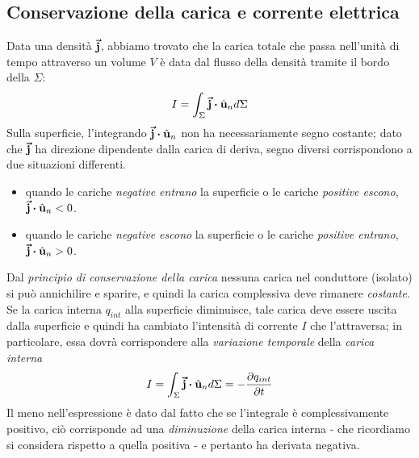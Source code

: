 \subsection{Conservazione della carica e corrente elettrica}
Data una densità $\vb*{\va{j}}$, abbiamo trovato che la carica totale che passa nell'unità di tempo attraverso un volume $V$ è data dal flusso della densità tramite il bordo della $\Sigma$:
\begin{equation*}
	I=\int_{\Sigma}\vba{j}\vdot\vbh{u}_nd\Sigma
\end{equation*}
Sulla superficie, l'integrando $\vba{j}\vdot\vbh{u}_n$ non ha necessariamente segno costante; dato che $\vb*{\va{j}}$ ha direzione dipendente dalla carica di deriva, segno diversi corrispondono a due situazioni differenti.
\begin{itemize}
	\item quando le cariche \textit{negative entrano} la superficie o le cariche \textit{positive escono}, $\vba{j}\vdot\vbh{u}_n<0$.
	\item  quando le cariche \textit{negative escono} la superficie o le cariche \textit{positive entrano}, $\vba{j}\vdot\vbh{u}_n>0$.
\end{itemize}
Dal \textit{principio di conservazione della carica} nessuna carica nel conduttore (isolato) si può annichilire e sparire, e quindi la carica complessiva deve rimanere \textit{costante}. Se la carica interna $q_{int}$ alla superficie diminuisce, tale carica deve essere uscita dalla superficie e quindi ha cambiato l'intensità di corrente $I$ che l'attraversa; in particolare, essa dovrà corrispondere alla \textit{variazione temporale} della \textit{carica interna}
\begin{equation}
	I=\int_{\Sigma}\vba{j}\vdot\vbh{u}_nd\Sigma=-\pdv{q_{int}}{t}
\end{equation}
Il meno nell'espressione è dato dal fatto che se l'integrale è complessivamente positivo, ciò corrisponde ad una \textit{diminuzione} della carica interna - che ricordiamo si considera rispetto a quella positiva - e pertanto ha derivata negativa.

